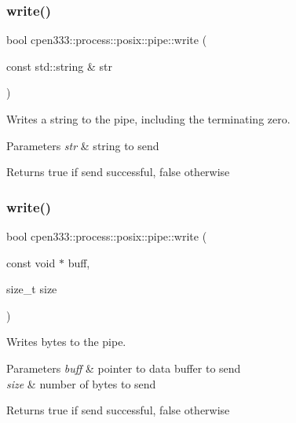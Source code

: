 \subsubsection{\texorpdfstring{write()}{write()}\hspace{0.1cm}{\footnotesize\ttfamily [1/2]}}
{\footnotesize\ttfamily bool cpen333\+::process\+::posix\+::pipe\+::write (\begin{DoxyParamCaption}\item[{const std\+::string \&}]{str }\end{DoxyParamCaption})\hspace{0.3cm}{\ttfamily [inline]}}



Writes a string to the pipe, including the terminating zero. 


\begin{DoxyParams}{Parameters}
{\em str} & string to send \\
\hline
\end{DoxyParams}
\begin{DoxyReturn}{Returns}
true if send successful, false otherwise 
\end{DoxyReturn}
\mbox{\label{classcpen333_1_1process_1_1posix_1_1pipe_abb450a7e724dd5ad8fc364b2cc75c311}} 
\subsubsection{\texorpdfstring{write()}{write()}\hspace{0.1cm}{\footnotesize\ttfamily [2/2]}}
{\footnotesize\ttfamily bool cpen333\+::process\+::posix\+::pipe\+::write (\begin{DoxyParamCaption}\item[{const void $\ast$}]{buff,  }\item[{size\+\_\+t}]{size }\end{DoxyParamCaption})\hspace{0.3cm}{\ttfamily [inline]}}



Writes bytes to the pipe. 


\begin{DoxyParams}{Parameters}
{\em buff} & pointer to data buffer to send \\
\hline
{\em size} & number of bytes to send \\
\hline
\end{DoxyParams}
\begin{DoxyReturn}{Returns}
true if send successful, false otherwise 
\end{DoxyReturn}



